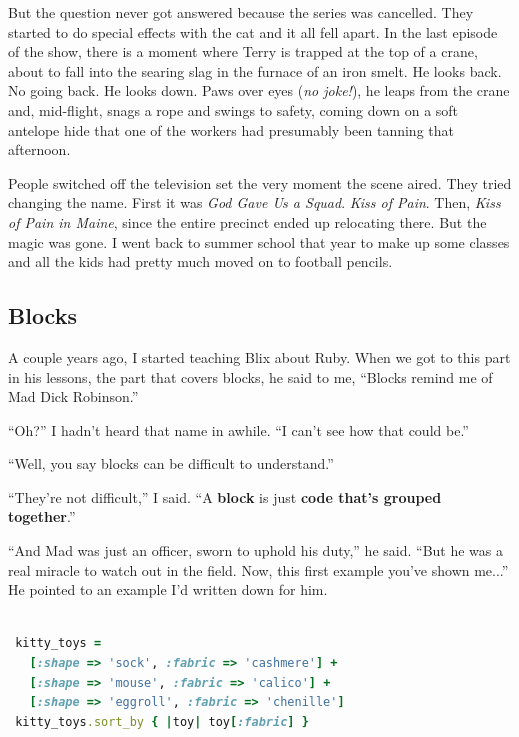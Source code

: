 \documentclass[10pt,twoside]{report}
\begin{document}
But the question never got answered because the series was cancelled.
They started to do special effects with the cat and it all fell apart.
In the last episode of the show, there is a moment where Terry is
trapped at the top of a crane, about to fall into the searing slag in
the furnace of an iron smelt.  He looks back.  No going back.  He
looks down.  Paws over eyes ({\em no joke!}), he leaps from the crane
and, mid-flight, snags a rope and swings to safety, coming down on a
soft antelope hide that one of the workers had presumably been tanning
that afternoon.

People switched off the television set the very moment the scene
aired.  They tried changing the name. First it was {\em God Gave Us a
  Squad}.  {\em Kiss of Pain}.  Then, {\em Kiss of Pain in Maine},
since the entire precinct ended up relocating there.  But the magic
was gone.  I went back to summer school that year to make up some
classes and all the kids had pretty much moved on to football pencils.



\subsection{Blocks}



A couple years ago, I started teaching Blix about Ruby.  When we got
to this part in his lessons, the part that covers blocks, he said to
me, ``Blocks remind me of Mad Dick Robinson.''

``Oh?''  I hadn't heard that name in awhile.  ``I can't see how that
could be.''

``Well, you say blocks can be difficult to understand.''

``They're not difficult,'' I said.  ``A {\bf block} is just {\bf code
  that's grouped together}.''

``And Mad was just an officer, sworn to uphold his duty,'' he said.
``But he was a real miracle to watch out in the field.  Now, this
first example you've shown me...''  He pointed to an example I'd
written down for him.


\begin{lstlisting}[basicstyle=\ttfamily\color{basiccolor},
    commentstyle = \ttfamily\color{commentcolor},
    keywordstyle=\ttfamily\color{keywordscolor},
    stringstyle=\color{stringcolor},
    language=Ruby,
    basicstyle=\small\ttfamily,
    showstringspaces=false,
  ]

 kitty_toys = 
   [:shape => 'sock', :fabric => 'cashmere'] +
   [:shape => 'mouse', :fabric => 'calico'] +
   [:shape => 'eggroll', :fabric => 'chenille'] 
 kitty_toys.sort_by { |toy| toy[:fabric] }

\end{lstlisting}
\end{document}
